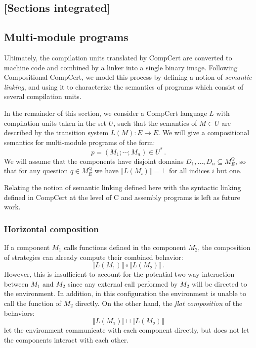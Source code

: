 \documentclass[format=sigplan,authordraft]{acmart}
\newcommand{\kw}[1]{\ensuremath{\mathsf{#1}}}
\begin{document}
\subsection*{[Sections integrated]}

\subsection{Multi-module programs}

Ultimately,
the compilation units translated by CompCert
are converted to machine code
and combined by a linker into a single
binary image.
Following Compositional CompCert,
we model this process by defining a notion of
\emph{semantic linking},
and using it to characterize the semantics
of programs which consist of several compilation units.

In the remainder of this section,
we consider a CompCert language $L$
with compilation units taken in the set $U$,
such that the semantics of $M \in U$
are described by the transition system $L(M) : E \rightarrow E$.
We will give a compositional semantics
for multi-module programs of the form:
\[
    p = (M_1; \cdots; M_n) \in U^* \,.
\]
We will assume that the components have disjoint domains
$D_1, \ldots, D_n \subseteq M_E^\kw{Q}$,
so that for any question $q \in M_E^\kw{Q}$
we have $\llbracket L(M_i) \rrbracket = \bot$
for all indices $i$ but one.

Relating the notion of semantic linking defined here
with the syntactic linking defined in CompCert
at the level of C and assembly programs
is left as future work.

\subsubsection{Horizontal composition}

If a component $M_1$ calls functions defined
in the component $M_2$,
the composition of strategies
can already compute their combined behavior:
\[
    \llbracket L(M_1) \rrbracket \circ
    \llbracket L(M_2) \rrbracket \,.
\]
However,
this is insufficient to account for
the potential two-way interaction between $M_1$ and $M_2$
since any external call performed by $M_2$
will be directed to the environment.
In addition,
in this configuration the environment
is unable to call the function of $M_2$ directly.
On the other hand,
the \emph{flat composition} of the behaviors:
\[
    \llbracket L(M_1) \rrbracket \sqcup
    \llbracket L(M_2) \rrbracket
\]
let the environment communicate with each component directly,
but does not let the components interact with each other.
\end{document}
